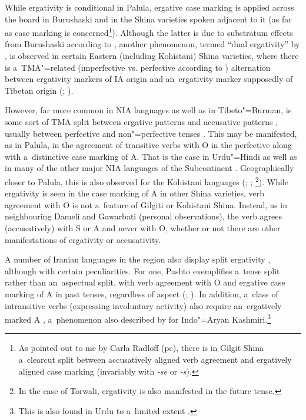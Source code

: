 While ergativity is conditional in Palula, ergative case marking is applied across the board in Burushaski and in the Shina varieties spoken adjacent to it (as far as case marking is concerned\footnote{As pointed out to me by Carla Radloff (pc), there is in Gilgit Shina a~clearcut split between accusatively aligned verb agreement and ergatively aligned case marking (invariably with \textit{-se} or \textit{-s}).}). Although the latter is due to substratum effects from Burushaski according to \citet[248]{masica2001}, another phenomenon, termed ``dual ergativity'' by \citet[213]{hookkoul2004}, is observed in certain Eastern (including Kohistani) Shina varieties, where there is a~TMA"=related (imperfective vs. perfective according to \citealt[51--53]{schmidtkohistani2008}) alternation between ergativity markers of IA origin and an~ergativity marker supposedly of Tibetan origin (\citealt[214]{hookkoul2004}; \citealt[211]{bailey1924}). 



However, far more common in NIA languages as well as in Tibeto"=Burman, is some sort of TMA split between ergative patterns and accusative patterns \citep[248]{masica2001}, usually between perfective and non"=perfective tenses \citep[342--343]{masica1991}. This may be manifested, as in Palula, in the agreement of transitive verbs with O in the perfective along with a~distinctive case marking of A. That is the case in Urdu"=Hindi \citep[124]{schmidt1999} as well as in many of the other major NIA languages of the Subcontinent \citep[248]{masica2001}. Geographically closer to Palula, this is also observed for the Kohistani languages (\citealt[136]{baart1999a}; \citealt[34]{hallberghallberg1999}; \citealt[93--95]{lunsford2001}\footnote{In the case of Torwali, ergativity is also manifested in the future tense.}). While ergativity is seen in the case marking of A in other Shina varieties, verb agreement with O is not a~feature of Gilgiti or Kohistani Shina. Instead, as in neighbouring Dameli and Gawarbati (personal observations), the verb agrees (accusatively) with S or A and never with O, whether or not there are other manifestations of ergativity or accusativity.



A number of Iranian languages in the region also display split ergativity \citep{payne1980}, although with certain peculiarities. For one, Pashto exemplifies a~tense split rather than an~aspectual split, with verb agreement with O and ergative case marking of A in past tenses, regardless of aspect (\citealt[4--5]{tegey1977}; \citealt[71--72]{lorenz1979}). In addition, a~class of intransitive verbs (expressing involuntary activity) also require an~ergatively marked A \citep[112]{babrakzai1999}, a~phenomenon also described by \citet[217]{hookkoul2004} for Indo"=Aryan Kashmiri.\footnote{This is also found in Urdu to a~limited extent \citep[168]{schmidt1999}.} 



